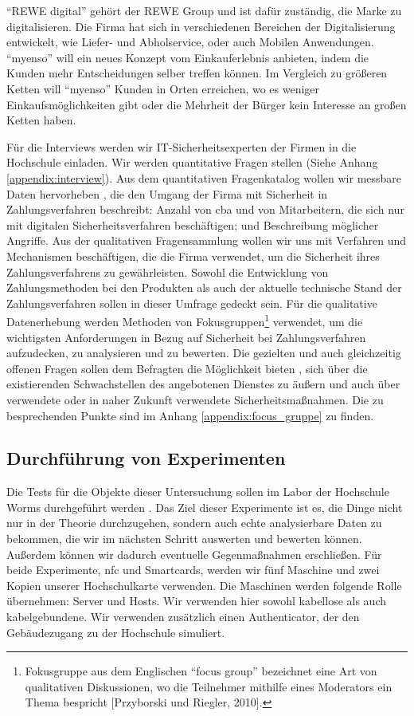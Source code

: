 ``REWE digital'' gehört der REWE Group und ist dafür zuständig, die Marke zu digitalisieren. Die Firma hat sich in verschiedenen 
Bereichen der Digitalisierung entwickelt, wie Liefer- und Abholservice, oder auch Mobilen Anwendungen. ``myenso'' will ein 
neues Konzept vom Einkauferlebnis anbieten, indem die Kunden mehr Entscheidungen selber treffen können. Im Vergleich zu größeren
Ketten will ``myenso'' Kunden in Orten erreichen, wo es weniger Einkaufsmöglichkeiten gibt oder die Mehrheit der Bürger
kein Interesse an großen Ketten haben.


Für die Interviews werden wir IT-Sicherheitsexperten der Firmen in die Hochschule einladen. Wir werden quantitative  Fragen 
stellen (Siehe Anhang \ref{appendix:interview}). Aus dem quantitativen Fragenkatalog wollen wir messbare Daten hervorheben 
\cite{refbook:SRJR}, die den Umgang der Firma mit Sicherheit in Zahlungsverfahren beschreibt: Anzahl von \acrfull{cba} und 
von Mitarbeitern, die sich nur mit digitalen Sicherheitsverfahren beschäftigen; und Beschreibung möglicher Angriffe. Aus der
qualitativen Fragensammlung wollen wir uns mit Verfahren und Mechanismen beschäftigen, die die Firma verwendet, um die Sicherheit
ihres Zahlungsverfahrens zu gewährleisten. Sowohl die Entwicklung von Zahlungsmethoden bei den Produkten als auch der aktuelle technische Stand der Zahlungsverfahren
sollen in dieser Umfrage gedeckt sein. Für die qualitative Datenerhebung werden Methoden von Fokusgruppen\footnote{Fokusgruppe
aus dem Englischen ``focus group'' bezeichnet eine Art von qualitativen Diskussionen, wo die Teilnehmer mithilfe eines 
Moderators ein Thema bespricht [Przyborski und Riegler, 2010].} verwendet, um die wichtigsten Anforderungen in Bezug auf
Sicherheit bei Zahlungsverfahren aufzudecken, zu analysieren und zu bewerten. Die gezielten und auch gleichzeitig offenen
Fragen sollen dem Befragten die Möglichkeit bieten \cite{refbook:EFAF}, sich über die existierenden Schwachstellen des angebotenen
Dienstes zu äußern und auch über verwendete oder in naher Zukunft verwendete Sicherheitsmaßnahmen. Die zu besprechenden Punkte sind 
im Anhang \ref{appendix:focus_gruppe} zu finden.

\subsection{Durchführung von Experimenten}

Die Tests für die Objekte dieser Untersuchung sollen im Labor der Hochschule Worms durchgeführt werden \cite{refbook:FWDL}. 
Das Ziel dieser Experimente ist es, die Dinge nicht nur in der Theorie durchzugehen, sondern auch echte analysierbare Daten zu bekommen,
die wir im nächsten Schritt auswerten und bewerten können. Außerdem können wir dadurch eventuelle Gegenmaßnahmen erschließen.
Für beide Experimente, \acrshort{nfc} und Smartcards, werden wir fünf Maschine und zwei Kopien unserer Hochschulkarte verwenden.
Die Maschinen werden folgende Rolle übernehmen: Server und Hosts. Wir verwenden hier sowohl kabellose als auch kabelgebundene.
Wir verwenden zusätzlich einen Authenticator, der den Gebäudezugang zu der Hochschule simuliert.


